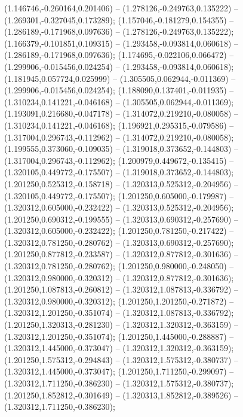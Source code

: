  (1.146746,-0.260164,0.201406) -- (1.278126,-0.249763,0.135222) -- (1.269301,-0.327045,0.173289);
 (1.157046,-0.181279,0.154355) -- (1.286189,-0.171968,0.097636) -- (1.278126,-0.249763,0.135222);
 (1.166379,-0.101851,0.109315) -- (1.293458,-0.093814,0.060618) -- (1.286189,-0.171968,0.097636);
 (1.174695,-0.022106,0.066472) -- (1.299906,-0.015456,0.024254) -- (1.293458,-0.093814,0.060618);
 (1.181945,0.057724,0.025999) -- (1.305505,0.062944,-0.011369) -- (1.299906,-0.015456,0.024254);
 (1.188090,0.137401,-0.011935) -- (1.310234,0.141221,-0.046168) -- (1.305505,0.062944,-0.011369);
 (1.193091,0.216680,-0.047178) -- (1.314072,0.219210,-0.080058) -- (1.310234,0.141221,-0.046168);
 (1.196921,0.295315,-0.079586) -- (1.317004,0.296743,-0.112962) -- (1.314072,0.219210,-0.080058);
 (1.199555,0.373060,-0.109035) -- (1.319018,0.373652,-0.144803) -- (1.317004,0.296743,-0.112962);
 (1.200979,0.449672,-0.135415) -- (1.320105,0.449772,-0.175507) -- (1.319018,0.373652,-0.144803);
 (1.201250,0.525312,-0.158718) -- (1.320313,0.525312,-0.204956) -- (1.320105,0.449772,-0.175507);
 (1.201250,0.605000,-0.179987) -- (1.320312,0.605000,-0.232422) -- (1.320313,0.525312,-0.204956);
 (1.201250,0.690312,-0.199555) -- (1.320313,0.690312,-0.257690) -- (1.320312,0.605000,-0.232422);
 (1.201250,0.781250,-0.217422) -- (1.320312,0.781250,-0.280762) -- (1.320313,0.690312,-0.257690);
 (1.201250,0.877812,-0.233587) -- (1.320312,0.877812,-0.301636) -- (1.320312,0.781250,-0.280762);
 (1.201250,0.980000,-0.248050) -- (1.320312,0.980000,-0.320312) -- (1.320312,0.877812,-0.301636);
 (1.201250,1.087813,-0.260812) -- (1.320312,1.087813,-0.336792) -- (1.320312,0.980000,-0.320312);
 (1.201250,1.201250,-0.271872) -- (1.320312,1.201250,-0.351074) -- (1.320312,1.087813,-0.336792);
 (1.201250,1.320313,-0.281230) -- (1.320312,1.320312,-0.363159) -- (1.320312,1.201250,-0.351074);
 (1.201250,1.445000,-0.288887) -- (1.320312,1.445000,-0.373047) -- (1.320312,1.320312,-0.363159);
 (1.201250,1.575312,-0.294843) -- (1.320312,1.575312,-0.380737) -- (1.320312,1.445000,-0.373047);
 (1.201250,1.711250,-0.299097) -- (1.320312,1.711250,-0.386230) -- (1.320312,1.575312,-0.380737);
 (1.201250,1.852812,-0.301649) -- (1.320313,1.852812,-0.389526) -- (1.320312,1.711250,-0.386230);
